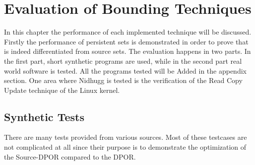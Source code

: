 \chapter{Evaluation of Bounding Techniques}
\label{Chapter 4}

In this chapter the performance of each implemented technique will be discussed. Firstly the performance of persistent sets is demonstrated in order to prove
that is indeed differentiated from source sets. The evaluation happens in two parts. In the first part, short synthetic programs are used, while in the second part
real world software is tested. All the programs tested will be Added in the appendix section. One area where Nidhugg is tested is the verification of the Read Copy Update
technique of the Linux kernel.


\section{Synthetic Tests}
There are many tests provided from various sources. Most of these testcases are not complicated at all since their purpose is to demonstrate the optimization
of the Source-DPOR compared to the DPOR.

